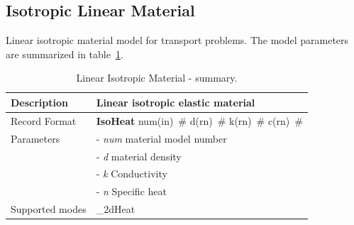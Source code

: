 \documentclass[epsf,a4paper]{article}
\newcommand{\descitem}[1]{{\noindent \bf #1}}
\newcommand{\elemparam}[2]{{{#1\tiny (#2)}~\#}}
\newcommand{\param}[1]{{\it #1}}
\begin{document}
\subsection{Isotropic Linear Material}
\label{IsoLET}
Linear isotropic material model for transport problems. The model parameters are summarized
in table~\ref{Isoheat_table}.

\begin{table}[h]                                                                
\begin{tabular}{|l|p{9cm}|}                                                      
\hline                                                                          
Description & Linear isotropic elastic material\\
\hline                                                                          
Record Format & \descitem{IsoHeat} \elemparam{num}{in}
\elemparam{d}{rn} \elemparam{k}{rn} \elemparam{c}{rn}\\
Parameters &- \param{num} material model number\\
&- \param{d} material density\\
&- \param{k} Conductivity\\
&- \param{n} Specific heat\\
Supported modes& \_2dHeat\\
\hline
\end{tabular}                                                                   
\caption{Linear Isotropic Material - summary.}                
\label{Isoheat_table}                                                         
\end{table}                                                                     
\end{document}
